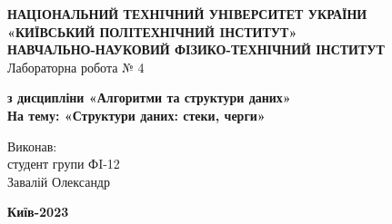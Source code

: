 \documentclass[a4paper,12pt]{article}
\begin{document}
    \begin{center}
        \hfill \break
        \large{\textbf{НАЦIОНАЛЬНИЙ ТЕХНIЧНИЙ УНIВЕРСИТЕТ УКРАЇНИ\\
                «КИЇВСЬКИЙ ПОЛIТЕХНIЧНИЙ IНСТИТУТ»\\
                НАВЧАЛЬНО-НАУКОВИЙ ФІЗИКО-ТЕХНІЧНИЙ ІНСТИТУТ}}\\
        \hfill \break \hfill \break \hfill\break \hfill \break \hfill \break \hfill \break \hfill \break
        \hfill \break \hfill \break \hfill \break \hfill \break
        \large{Лабораторна робота № 4}
        \begin{center}
            \normalsize{\textbf{з дисципліни «Алгоритми та структури даних» \\
            На тему: «Структури даних: стеки, черги» \\}}
        \end{center}
    \end{center}
    \hfill \break \hfill \break \hfill \break \hfill \break \hfill \break \hfill \break \hfill \break
    \hfill \break \hfill \break \hfill \break \hfill \break \hfill \break \hfill \break 
    \begin{flushright}
        \large{ \hspace{35pt} Виконав:\\
            студент групи ФI-12\\
            Завалій Олександр} 
    \end{flushright}
    \hfill \break \hfill \break \hfill \break \hfill \break \hfill \break \hfill \break \hfill \break
    \hfill \break
    \begin{center} \textbf{Київ-2023} \end{center}
    \thispagestyle{empty}
\end{document}
